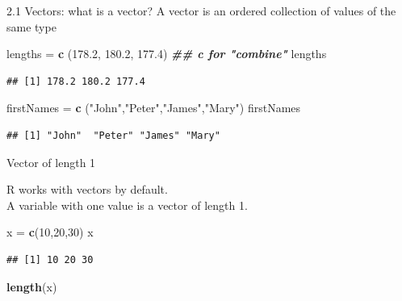\documentclass[
  ignorenonframetext,
]{beamer}
\newenvironment{Shaded}{\begin{snugshade}}{\end{snugshade}}
\newcommand{\DecValTok}[1]{\textcolor[rgb]{0.00,0.00,0.81}{#1}}
\newcommand{\DocumentationTok}[1]{\textcolor[rgb]{0.56,0.35,0.01}{\textbf{\textit{#1}}}}
\newcommand{\FloatTok}[1]{\textcolor[rgb]{0.00,0.00,0.81}{#1}}
\newcommand{\FunctionTok}[1]{\textcolor[rgb]{0.13,0.29,0.53}{\textbf{#1}}}
\newcommand{\NormalTok}[1]{#1}
\newcommand{\OtherTok}[1]{\textcolor[rgb]{0.56,0.35,0.01}{#1}}
\newcommand{\StringTok}[1]{\textcolor[rgb]{0.31,0.60,0.02}{#1}}
\begin{document}
\begin{frame}[fragile]{2.1 Vectors: what is a vector?}
\protect\hypertarget{vectors-what-is-a-vector}{}
A vector is an ordered collection of values of the same type

\begin{Shaded}
\begin{Highlighting}[]
\NormalTok{lengths }\OtherTok{=} \FunctionTok{c}\NormalTok{ (}\FloatTok{178.2}\NormalTok{, }\FloatTok{180.2}\NormalTok{, }\FloatTok{177.4}\NormalTok{) }\DocumentationTok{\#\# c for "combine"}
\NormalTok{lengths}
\end{Highlighting}
\end{Shaded}

\begin{verbatim}
## [1] 178.2 180.2 177.4
\end{verbatim}

\begin{Shaded}
\begin{Highlighting}[]
\NormalTok{firstNames }\OtherTok{=} \FunctionTok{c}\NormalTok{ (}\StringTok{"John"}\NormalTok{,}\StringTok{"Peter"}\NormalTok{,}\StringTok{"James"}\NormalTok{,}\StringTok{"Mary"}\NormalTok{)}
\NormalTok{firstNames}
\end{Highlighting}
\end{Shaded}

\begin{verbatim}
## [1] "John"  "Peter" "James" "Mary"
\end{verbatim}

Vector of length 1

R works with vectors by default.\\
A variable with one value is a vector of length 1.

\begin{Shaded}
\begin{Highlighting}[]
\NormalTok{x }\OtherTok{=} \FunctionTok{c}\NormalTok{(}\DecValTok{10}\NormalTok{,}\DecValTok{20}\NormalTok{,}\DecValTok{30}\NormalTok{)}
\NormalTok{x}
\end{Highlighting}
\end{Shaded}

\begin{verbatim}
## [1] 10 20 30
\end{verbatim}

\begin{Shaded}
\begin{Highlighting}[]
\FunctionTok{length}\NormalTok{(x) }
\end{Highlighting}
\end{Shaded}


\end{frame}
\end{document}
